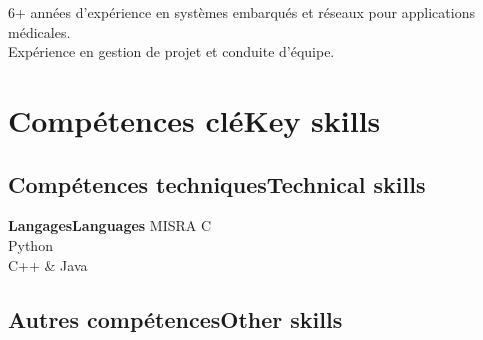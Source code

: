 \vspace{-1.cm}

\ifnativelang
\newcommand{\CVheader}{6+ ann\'ees d'exp\'erience en syst\`emes embarqu\'es et r\'eseaux pour applications m\'edicales.\\ Exp\'erience en gestion de projet et conduite d'\'equipe.}
\else
\newcommand{\CVheader}{6+ years of experience in Real-Time systems, embedded linux and networking.\\
Experience in project steering and team management.}
\fi

\begin{center}
\textcolor{color1}{\Large{\CVheader}}
\end{center}

\section{\ifnativelang Comp\'etences cl\'e\else Key skills\fi}
\subsection{\ifnativelang Comp\'etences techniques\else Technical skills\fi}

{\ifnativelang\textbf{Langages}\else \textbf{Languages}\fi}{
 MISRA C\\
 Python \\
 C++ \& Java
}

\vspace{\ItemsMinSpacing}

\subsection{\ifnativelang Autres comp\'etences\else Other skills\fi}


